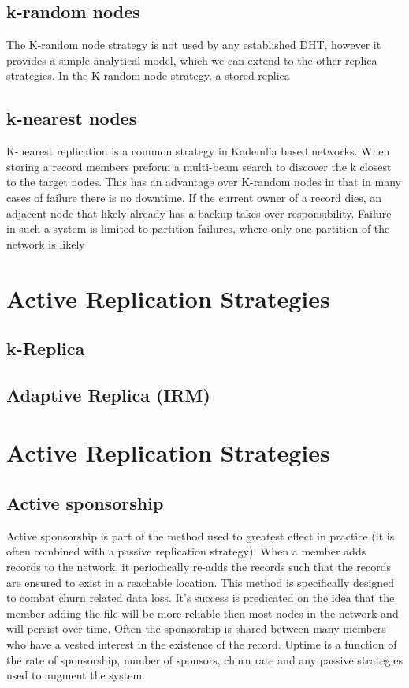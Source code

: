 \subsection{k-random nodes}
The K-random node strategy is not used by any established DHT, however it provides a simple analytical model, which we can extend to the other replica strategies.
In the K-random node strategy, a stored replica


\subsection{k-nearest nodes}
K-nearest replication is a common strategy in Kademlia based networks.
When storing a record members preform a multi-beam search to discover the k closest to the target nodes.
This has an advantage over K-random nodes in that in many cases of failure there is no downtime.
If the current owner of a record dies, an adjacent node that likely already has a backup takes over responsibility.
Failure in such a system is limited to partition failures, where only one partition of the network is likely 


\section{Active Replication Strategies}


\subsection{k-Replica}
\subsection{Adaptive Replica (IRM)}

\section{Active Replication Strategies}
\subsection{Active sponsorship}
Active sponsorship is part of the method used to greatest effect in practice (it is often combined with a passive replication strategy).
When a member adds records to the network, it periodically re-adds the records such that the records are ensured to exist in a reachable location.
This method is specifically designed to combat churn related data loss.
It's success is predicated on the idea that the member adding the file will be more reliable then most nodes in the network and will persist over time.
Often the sponsorship is shared between many members who have a vested interest in the existence of the record.
Uptime is a function of the rate of sponsorship, number of sponsors, churn rate and any passive strategies used to augment the system.
